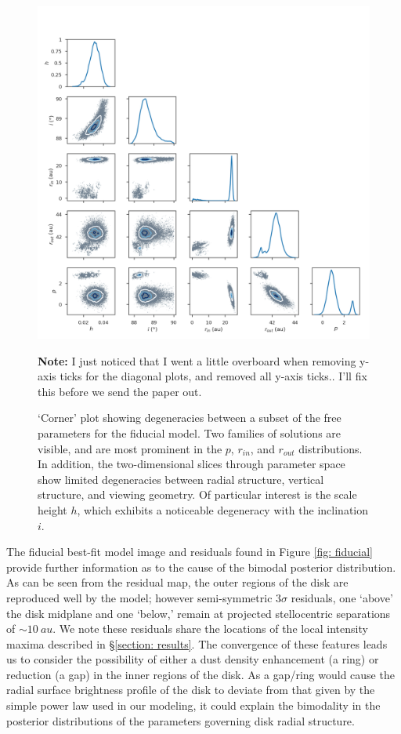 \documentclass[modern]{aastex62}
\begin{document}
\begin{figure}
  \centering
  \includegraphics[width=\linewidth]{../figures/degeneracy_corner}
  \caption{`Corner' plot showing degeneracies between a subset of the free parameters for the fiducial model.
  Two families of solutions are visible, and are most prominent in the $p$, $r_{in}$, and $r_{out}$ distributions.
  In addition, the two-dimensional slices through parameter space show limited degeneracies between radial structure, vertical structure, and viewing geometry.
  Of particular interest is the scale height $h$, which exhibits a noticeable degeneracy with the inclination $i$.}
  \textbf{Note:} I just noticed that I went a little overboard when removing y-axis ticks for the diagonal plots, and removed all y-axis ticks.. I'll fix this before we send the paper out.
  \label{fig: degeneracies}
\end{figure}

The fiducial best-fit model image and residuals found in Figure \ref{fig: fiducial} provide further information as to the cause of the bimodal posterior distribution.
As can be seen from the residual map, the outer regions of the disk are reproduced well by the model; however semi-symmetric $3\sigma$ residuals, one `above' the disk midplane and one `below,' remain at projected stellocentric separations of $\sim \SI{10}{au}$. 
We note these residuals share the locations of the local intensity maxima described in \S \ref{section: results}. 
The convergence of these features leads us to consider the possibility of either a dust density enhancement (a ring) or reduction (a gap) in the inner regions of the disk. 
As a gap/ring would cause the radial surface brightness profile of the disk to deviate from that given by the simple power law used in our modeling, it could explain the bimodality in the posterior distributions of the parameters governing disk radial structure.
\end{document}
